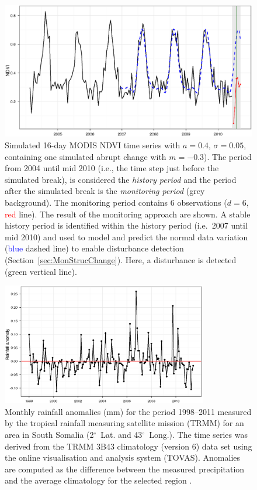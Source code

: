 \documentclass[authoryear,preprint,review,10pt]{elsarticle}
\newcommand{\degree}{\ensuremath{^\circ}}
\begin{document}
 \begin{figure}[htp]
\centering
    \includegraphics[width=1\textwidth]{figs/Fig1Sim_Monitoring_ggplot.eps}
  \caption{Simulated 16-day MODIS NDVI time series with $a = 0.4$, $\sigma = 0.05$, containing one simulated abrupt change with $m = -0.3$). The period from 2004 until mid 2010 (i.e., the time step just before the simulated break), is considered the \emph{history period} and the period after the simulated break is the \emph{monitoring period} (grey background). The monitoring period contains 6 observations  ($d = 6$, \textcolor{red} {red} line). The result of the monitoring approach are shown. A stable history period is identified within the history period (i.e.\ 2007 until mid 2010) and used to model and predict the normal data variation (\textcolor{blue} {blue} dashed line) to enable disturbance detection (Section~\ref{sec:MonStrucChange}).  Here, a disturbance is detected (\textcolor{OliveGreen} {green} vertical line).}
  \label{fig:SimMonitor}
\end{figure}

 \begin{figure}[htp]
\centering
    \includegraphics[width=0.8\textwidth]{figs/RainfallAnomaly.eps}
  \caption{Monthly rainfall anomalies (mm) for the period 1998--2011 measured by the tropical rainfall measuring satellite mission (TRMM) for an area in South Somalia (2\degree~Lat. and 43\degree~Long.). The time series was derived from the TRMM 3B43 climatology (version 6) data set using the online visualisation and analysis system (TOVAS). Anomalies are computed as the difference between the measured precipitation and the average climatology for the selected region \citep{Acker:2007vk}.}
  \label{fig:RF}
\end{figure}
\end{document}
